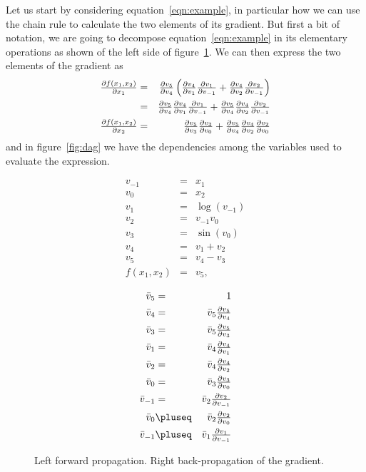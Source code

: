 \documentclass{article}
\begin{document}
Let us start by considering equation~\ref{eqn:example}, in particular how we can
use the chain rule to calculate the two elements of its gradient. But first a
bit of notation, we are going to decompose equation~\ref{eqn:example} in its
elementary operations as shown of the left side of figure~\ref{fig:example}.
We can then express the two elements of the gradient as
\begin{eqnarray*}
\partialfrac{f(x_1,x_2)}{x_1}
&=& \partialfrac{v_5}{v_4}\left(\partialfrac{v_4}{v_1}\partialfrac{v_1}{v_{-1}}
	+ \partialfrac{v_4}{v_2}\partialfrac{v_2}{v_{-1}}\right) \\
&=& \partialfrac{v_5}{v_4}\partialfrac{v_4}{v_1}\partialfrac{v_1}{v_{-1}}
	+ \partialfrac{v_5}{v_4}\partialfrac{v_4}{v_2}\partialfrac{v_2}{v_{-1}} \\
\partialfrac{f(x_1,x_2)}{x_2}
&=& \partialfrac{v_5}{v_3}\partialfrac{v_3}{v_0}
	+ \partialfrac{v_5}{v_4}\partialfrac{v_4}{v_2}\partialfrac{v_2}{v_0}
\end{eqnarray*}
and in figure~\ref{fig:dag} we have the dependencies among the variables used
to evaluate the expression.

\begin{figure}
\begin{minipage}{.5\textwidth}
\begin{eqnarray*}
v_{-1} &=& x_1 \\
v_0 &=& x_2 \\
v_1 &=& \log(v_{-1}) \\
v_2 &=& v_{-1}v_0 \\
v_3 &=& \sin(v_0) \\
v_4 &=& v_1+v_2 \\
v_5 &=& v_4-v_3 \\
f(x_1,x_2) &=& v_5,
\end{eqnarray*}
\end{minipage}
\begin{minipage}{.5\textwidth}
\renewcommand{\partialfrac}[2]{\textstyle\frac{\partial#1}{\partial#2}}
\begin{eqnarray*}
\bar v_5 &=& 1 \\
\bar v_4 &=& \bar v_5 \partialfrac{v_5}{v_4} \\
\bar v_3 &=& \bar v_5 \partialfrac{v_5}{v_3} \\
\bar v_1 &=& \bar v_4 \partialfrac{v_4}{v_1} \\
\bar v_2 &=& \bar v_4 \partialfrac{v_4}{v_2} \\
\bar v_0 &=& \bar v_3 \partialfrac{v_3}{v_0} \\
\bar v_{-1} &=& \bar v_2 \partialfrac{v_2}{v_{-1}} \\
\bar v_0 &\pluseq& \bar v_2 \partialfrac{v_2}{v_0} \\
\bar v_{-1} &\pluseq& \bar v_1 \partialfrac{v_1}{v_{-1}}
\end{eqnarray*}
\end{minipage}
\label{fig:example}
\caption{Left forward propagation. Right back-propagation of the gradient.}
\end{figure}
\end{document}

